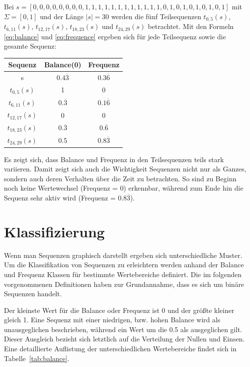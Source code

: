 \begin{theorem}
Bei $s = [0,0,0,0,0,0,0,0,1,1,1,1,1,1,1,1,1,1,1,1,0,1,0,1,0,1,0,1,0,1]$ mit $\Sigma = [0,1]$ und der Länge $|s| = 30$ werden die fünf Teilsequenzen $t_{0,5}(s)$, $t_{6,11}(s)$, $t_{12,17}(s)$, $t_{18,23}(s)$ und $t_{24,29}(s)$ betrachtet. Mit den Formeln \ref{eq:balance} und \ref{eq:frequence} ergeben sich für jede Teilsequenz sowie die gesamte Sequenz:

\begin{center}
	\begin{tabular}{|c c c|} 
		\hline
		Sequenz & Balance(0) & Frequenz \\
		\hline\hline
		s & $0.4\overline{3}$ & $0.3\overline{6}$ \\ 
		\hline
		$t_{0,5}(s)$ & 1 & 0 \\ 
		\hline
		$t_{6,11}(s)$ & $0.\overline{3}$ & $0.1\overline{6}$ \\
		\hline
		$t_{12,17}(s)$ & 0 & 0 \\
		\hline
		$t_{18,23}(s)$ & $0.\overline{3}$ & $0.\overline{6}$ \\
		\hline
		$t_{24,29}(s)$ & 0.5 & $0.8\overline{3}$ \\
		\hline
	\end{tabular}
\end{center}

Es zeigt sich, dass Balance und Frequenz in den Teilsequenzen teils stark variieren. Damit zeigt sich auch die Wichtigkeit Sequenzen nicht nur als Ganzes, sondern auch deren Verhalten über die Zeit zu betrachten. So sind zu Beginn noch keine Wertewechsel (Frequenz = 0) erkennbar, während zum Ende hin die Sequenz sehr aktiv wird (Frequenz = 0.8$\overline{3}$).
\end{theorem}

\section{Klassifizierung}
Wenn man Sequenzen graphisch darstellt ergeben sich unterschiedliche Muster. Um die Klassifikation von Sequenzen zu erleichtern werden anhand der Balance und Frequenz Klassen für bestimmte Wertebereiche definiert. Die im folgenden vorgenommenen Definitionen haben zur Grundannahme, dass es sich um binäre Sequenzen handelt.

Der kleinste Wert für die Balance oder Frequenz ist 0 und der größte kleiner gleich 1. Eine Sequenz mit einer niedrigen, bzw. hohen Balance wird als unausgeglichen beschrieben, während ein Wert um die 0.5 als ausgeglichen gilt. Dieser Ausgleich bezieht sich letztlich auf die Verteilung der Nullen und Einsen. Eine detaillierte Auflistung der unterschiedlichen Wertebereiche findet sich in Tabelle~\ref{tab:balance}. 

